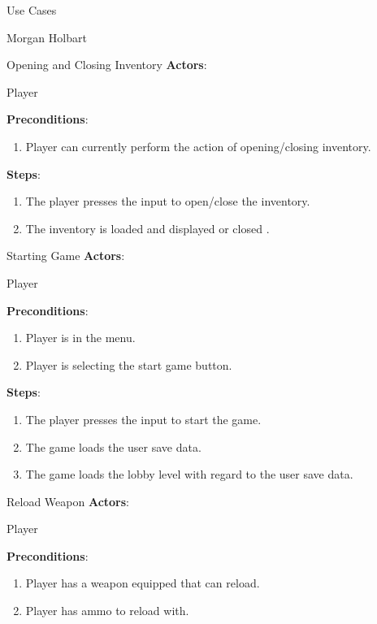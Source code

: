 \documentclass[12pt]{report}
\begin{document}
\begin{section}{Use Cases}
\begin{subsection}{Morgan Holbart}
\begin{subsubsection}{Opening and Closing Inventory}
\textbf{Actors}:

Player

\textbf{Preconditions}:
 
\begin{enumerate}
\item Player can currently perform the action of opening/closing inventory.
\end{enumerate}

\textbf{Steps}:

\begin{enumerate}
\item The player presses the input to open/close the inventory.
\item The inventory is loaded and displayed or closed .
\end{enumerate}
\end{subsubsection}

\begin{subsubsection}{Starting Game}
\textbf{Actors}:

Player

\textbf{Preconditions}:
 
\begin{enumerate}
\item Player is in the menu.
\item Player is selecting the start game button.
\end{enumerate}

\textbf{Steps}:

\begin{enumerate}
\item The player presses the input to start the game.
\item The game loads the user save data.
\item The game loads the lobby level with regard to the user save data.
\end{enumerate}
\end{subsubsection}

\begin{subsubsection}{Reload Weapon}
\textbf{Actors}:

Player

\textbf{Preconditions}:
 
\begin{enumerate}
\item Player has a weapon equipped that can reload.
\item Player has ammo to reload with.
\end{enumerate}


\end{subsubsection}
\end{subsection}
\end{section}
\end{document}
